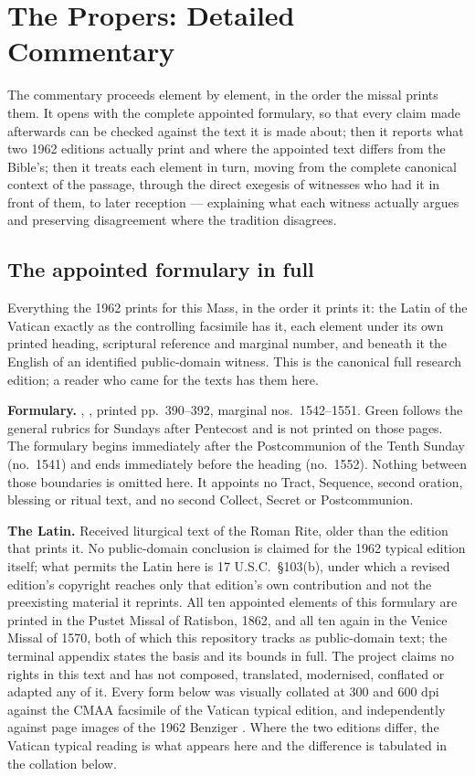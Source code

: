 \section*{The Propers: Detailed Commentary}

The commentary proceeds element by element, in the order the missal prints
them. It opens with the complete appointed formulary, so that every claim made
afterwards can be checked against the text it is made about; then it reports
what two 1962 editions actually print and where the appointed text differs from
the Bible's; then it treats each element in turn, moving from the complete
canonical context of the passage, through the direct exegesis of witnesses who
had it in front of them, to later reception --- explaining what each witness
actually argues and preserving disagreement where the tradition disagrees.

\subsection*{The appointed formulary in full}

Everything the 1962  prints for this Mass, in the order
it prints it: the Latin of the Vatican  exactly as the
controlling facsimile has it, each element under its own printed heading,
scriptural reference and marginal number, and beneath it the English of an
identified public-domain witness. This is the canonical full research edition;
a reader who came for the texts has them here.

\textbf{Formulary.} , , printed pp.~390--392, marginal nos.\ 1542--1551. Green follows the
general rubrics for Sundays after Pentecost and is not printed on those pages.
The formulary begins immediately after the Postcommunion of the Tenth Sunday
(no.\ 1541) and ends immediately before the heading  (no.\ 1552). Nothing between those boundaries is omitted
here. It appoints no Tract, Sequence, second oration, blessing or ritual text,
and no second Collect, Secret or Postcommunion.

\textbf{The Latin.} Received liturgical text of the Roman Rite, older than the
edition that prints it. No public-domain conclusion is claimed for the 1962
typical edition itself; what permits the Latin here is 17 U.S.C.\ \S103(b),
under which a revised edition's copyright reaches only that edition's own
contribution and not the preexisting material it reprints. All ten appointed
elements of this formulary are printed in the Pustet Missal of Ratisbon, 1862,
and all ten again in the Venice Missal of 1570, both of which this repository
tracks as public-domain text; the terminal appendix states the basis and its
bounds in full. The project claims no rights in this text and has not
composed, translated, modernised, conflated or adapted any of it. Every form
below was visually collated at 300 and 600 dpi against the CMAA facsimile of
the Vatican typical edition, and independently against page images of the 1962
Benziger . Where the two editions differ, the
Vatican typical reading is what appears here and the difference is tabulated
in the collation below.

